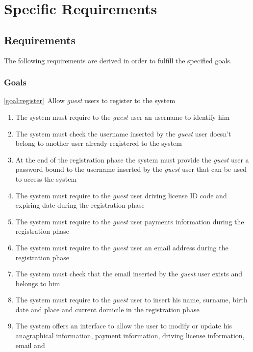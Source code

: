 \section{Specific Requirements}

\subsection{Requirements}
The following requirements are derived in order to fulfill the specified goals.
\subsubsection{Goals}
	\begin{description}
		\item \ref{goal:register}\ Allow \emph{guest} users to register to the system
			\begin{enumerate}[label=\textbf{R\arabic*}]
  				\item The system must require to the  \emph{guest} user an username to identify him
   				\item The system must check the username inserted by the  \emph{guest} user
   				doesn't belong to another user already registered to the system 
   				\item At the end of the registration phase the system must provide the  \emph{guest}
   				user a password bound to the username inserted by the  \emph{guest} user that can
   				be used to access the system
   				\item The system must require to the  \emph{guest} user driving license ID code and
   				expiring date during the registration phase
   				\item The system must require to the  \emph{guest} user payments information
   				during the registration phase
   				\item The system must require to the  \emph{guest} user an email address during the
   				registration phase
   				\item The system must check that the email inserted by the  \emph{guest} user exists
   				and belongs to him
   				\item The system must require to the  \emph{guest} user to insert his name, surname,
   				birth date and place and current domicile in the registration phase
   				\item The system offers an interface to allow the user to modify or update his
   				anagraphical information, payment information, driving license information, email and

\end{enumerate}
\end{description}
